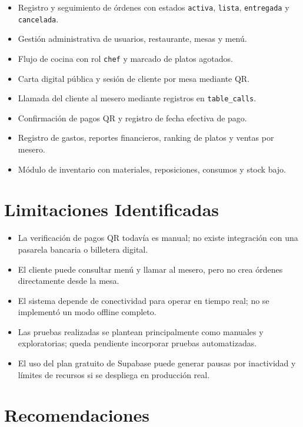 \begin{itemize}[leftmargin=1.5em]
  \item Registro y seguimiento de órdenes con estados \texttt{activa}, \texttt{lista},
        \texttt{entregada} y \texttt{cancelada}.
  \item Gestión administrativa de usuarios, restaurante, mesas y menú.
  \item Flujo de cocina con rol \texttt{chef} y marcado de platos agotados.
  \item Carta digital pública y sesión de cliente por mesa mediante QR.
  \item Llamada del cliente al mesero mediante registros en \texttt{table\_calls}.
  \item Confirmación de pagos QR y registro de fecha efectiva de pago.
  \item Registro de gastos, reportes financieros, ranking de platos y ventas por mesero.
  \item Módulo de inventario con materiales, reposiciones, consumos y stock bajo.
\end{itemize}

\section{Limitaciones Identificadas}

\begin{itemize}[leftmargin=1.5em]
  \item La verificación de pagos QR todavía es manual; no existe integración con una
        pasarela bancaria o billetera digital.
  \item El cliente puede consultar menú y llamar al mesero, pero no crea órdenes
        directamente desde la mesa.
  \item El sistema depende de conectividad para operar en tiempo real; no se implementó
        un modo offline completo.
  \item Las pruebas realizadas se plantean principalmente como manuales y exploratorias;
        queda pendiente incorporar pruebas automatizadas.
  \item El uso del plan gratuito de Supabase puede generar pausas por inactividad y
        límites de recursos si se despliega en producción real.
\end{itemize}

\section{Recomendaciones}

